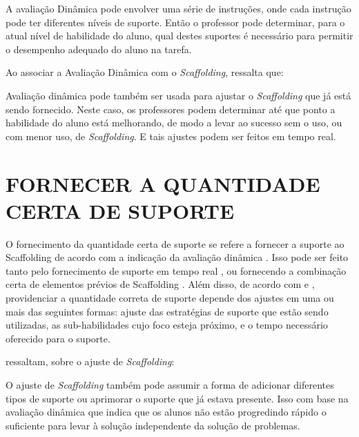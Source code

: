 A avaliação Dinâmica pode envolver uma série de instruções, onde cada instrução pode ter diferentes níveis de suporte. Então o professor pode determinar, para o atual nível de habilidade do aluno, qual destes suportes é necessário para permitir o desempenho adequado do aluno na tarefa. 

Ao associar a Avaliação Dinâmica com o \textit{Scaffolding},  ressalta que: 

\begin{quoting}[leftmargin=4cm, rightmargin=0cm]
\noindent Avaliação dinâmica pode também ser usada para ajustar o \textit{Scaffolding} que já está sendo fornecido. Neste caso, os professores podem determinar até que ponto a habilidade do aluno está melhorando, de modo a levar ao sucesso sem o uso, ou com menor uso, de \textit{Scaffolding}. E tais ajustes podem ser feitos em tempo real. 
\end{quoting}

\section{FORNECER A QUANTIDADE CERTA DE SUPORTE}

O fornecimento da quantidade certa de suporte se refere a fornecer a suporte ao Scaffolding de acordo com a indicação da avaliação dinâmica \cite{wood1976,Belland2017}. Isso pode ser feito tanto pelo fornecimento de suporte em tempo real \cite{Jadallah2011,vanPol2012,Belland2017}, ou fornecendo a combinação certa de elementos prévios de Scaffolding \cite{Koedinger2006,Belland2017}. Além disso, de acordo com  e , providenciar a quantidade correta de suporte depende dos ajustes em uma ou mais das seguintes formas: ajuste das estratégias de suporte que estão sendo utilizadas, as sub-habilidades cujo foco esteja próximo, e o tempo necessário oferecido para o suporte. 

 ressaltam, sobre o ajuste de \textit{Scaffolding}: 

\begin{quoting}[leftmargin=4cm, rightmargin=0cm]
\noindent O ajuste de \textit{Scaffolding} também pode assumir a forma de adicionar diferentes tipos de suporte ou aprimorar o suporte que já estava presente. Isso com base na avaliação dinâmica que indica que os alunos não estão progredindo rápido o suficiente para levar à solução independente da solução de problemas. 
\end{quoting}

